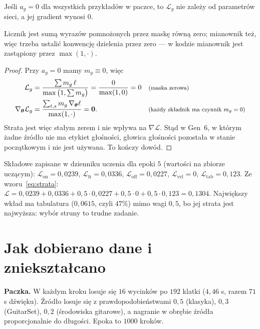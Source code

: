 \begin{twierdzenie}\label{tw:maska}
Jeśli $a_g=0$ dla wszystkich przykładów w paczce, to $\mathcal L_g$ nie zależy od parametrów sieci, a jej gradient wynosi $0$.
\end{twierdzenie}
\begin{pomyslDowodu}
Licznik jest sumą wyrazów pomnożonych przez maskę równą zero; mianownik też, więc trzeba ustalić konwencję dzielenia przez zero --- w kodzie mianownik jest zastąpiony przez $\max(1,\cdot)$.
\end{pomyslDowodu}
\begin{proof}
Przy $a_g=0$ mamy $m_g\equiv0$, więc
\begin{align*}
\mathcal L_g &= \frac{\sum m_g\,\ell}{\max\big(1,\sum m_g\big)}=\frac{0}{\max(1,0)}=0 && \text{\footnotesize (maska zerowa)}\\
\nabla_{\bm{\theta}}\mathcal L_g &= \frac{\sum_{t,s}m_g\,\nabla_{\bm{\theta}}\ell}{\max(1,\cdot)}=\bm{0}. && \text{\footnotesize (każdy składnik ma czynnik $m_g=0$)}
\end{align*}
Strata jest więc stałym zerem i nie wpływa na $\nabla\mathcal L$. Stąd w Gen~6, w którym żadne źródło nie ma etykiet głośności, głowica głośności pozostała w stanie początkowym i nie jest używana. To kończy dowód.
\end{proof}

\begin{naliczbach}
Składowe zapisane w dzienniku uczenia dla epoki $5$ (wartości na zbiorze uczącym): $\mathcal L_\mathrm{on}=0{,}0239$, $\mathcal L_\mathrm{fr}=0{,}0336$, $\mathcal L_\mathrm{off}=0{,}0227$, $\mathcal L_\mathrm{vel}=0$, $\mathcal L_\mathrm{tab}=0{,}123$. Ze wzoru~\eqref{eq:strata}:
$\mathcal L=0{,}0239+0{,}0336+0{,}5\cdot0{,}0227+0{,}5\cdot0+0{,}5\cdot0{,}123=0{,}1304$. Największy wkład ma tabulatura ($0{,}0615$, czyli $47\%$) mimo wagi $0{,}5$, bo jej strata jest najwyższa: wybór struny to trudne zadanie.
\end{naliczbach}

\section{Jak dobierano dane i zniekształcano}

\textbf{Paczka.} W każdym kroku losuje się $16$ wycinków po $192$ klatki ($4{,}46$ s, razem $71$ s dźwięku). Źródło losuje się z prawdopodobieństwami $0{,}5$ (klasyka), $0{,}3$ (GuitarSet), $0{,}2$ (środowiska gitarowe), a nagranie w obrębie źródła proporcjonalnie do długości. Epoka to $1000$ kroków.

